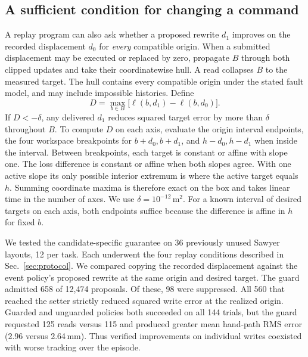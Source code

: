 \subsection{A sufficient condition for changing a command}
A replay program can also ask whether a proposed rewrite $d_1$ improves on the recorded displacement $d_0$ for \emph{every} compatible origin. When a submitted displacement may be executed or replaced by zero, propagate $B$ through both clipped updates and take their coordinatewise hull. A read collapses $B$ to the measured target. The hull contains every compatible origin under the stated fault model, and may include impossible histories. Define
\begin{equation}
 D=\max_{b\in B}\big[\ell(b,d_1)-\ell(b,d_0)\big].\label{eq:guard}
\end{equation}
If $D<-\delta$, any delivered $d_1$ reduces squared target error by more than $\delta$ throughout $B$. To compute $D$ on each axis, evaluate the origin interval endpoints, the four workspace breakpoints for $b+d_0,b+d_1$, and $h-d_0,h-d_1$ when inside the interval. Between breakpoints, each target is constant or affine with slope one. The loss difference is constant or affine when both slopes agree. With one active slope its only possible interior extremum is where the active target equals $h$. Summing coordinate maxima is therefore exact on the box and takes linear time in the number of axes. We use $\delta=10^{-12}\,\mathrm{m}^2$. For a known interval of desired targets on each axis, both endpoints suffice because the difference is affine in $h$ for fixed $b$.

We tested the candidate-specific guarantee on 36 previously unused Sawyer layouts, 12 per task. Each underwent the four replay conditions described in Sec.~\ref{sec:protocol}. We compared copying the recorded displacement against the event policy's proposed rewrite at the same origin and desired target. The guard admitted 658 of 12,474 proposals. Of these, 98 were suppressed. All 560 that reached the setter strictly reduced squared write error at the realized origin. Guarded and unguarded policies both succeeded on all 144 trials, but the guard requested 125 reads versus 115 and produced greater mean hand-path RMS error (2.96 versus 2.64\,mm). Thus verified improvements on individual writes coexisted with worse tracking over the episode.
